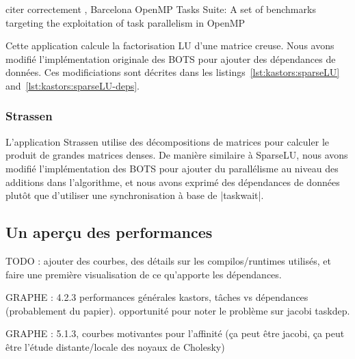 \begin{todo}
citer correctement \cite{Duran2009}, Barcelona OpenMP Tasks Suite: A set of benchmarks targeting the exploitation of task parallelism in OpenMP
\end{todo}

Cette application calcule la factorisation LU d'une matrice creuse.
Nous avons modifié l'implémentation originale des BOTS pour ajouter des dépendances de données.
Ces modificiations sont décrites dans les listings~\ref{lst:kastors:sparseLU} and~\ref{lst:kastors:sparseLU-deps}.

\subsubsection{Strassen}

L'application Strassen utilise des décompositions de matrices pour calculer le produit de grandes matrices denses.
De manière similaire à SparseLU, nous avons modifié l'implémentation des BOTS pour ajouter du parallélisme au niveau des additions dans l'algorithme, et nous avons exprimé des dépendances de données plutôt que d'utiliser une synchronisation à base de |taskwait|.


\subsection{Un aperçu des performances}

TODO : ajouter des courbes, des détails sur les compilos/runtimes utilisés, et faire une première visualisation de ce qu'apporte les dépendances.

GRAPHE : 4.2.3 performances générales kastors, tâches vs dépendances (probablement du papier). opportunité pour noter le problème sur jacobi taskdep.

GRAPHE : 5.1.3, courbes motivantes pour l'affinité (ça peut être jacobi, ça peut être l'étude distante/locale des noyaux de Cholesky)
